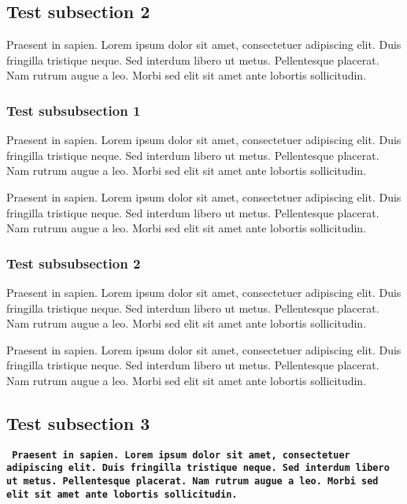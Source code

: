 \subsection*{Test subsection 2}
Praesent in sapien. Lorem ipsum dolor sit amet, consectetuer adipiscing elit.
Duis fringilla tristique neque. Sed interdum libero ut metus. Pellentesque placerat.
Nam rutrum augue a leo. Morbi sed elit sit amet ante lobortis sollicitudin.

\subsubsection*{Test subsubsection 1}
Praesent in sapien. Lorem ipsum dolor sit amet, consectetuer adipiscing elit.
Duis fringilla tristique neque. Sed interdum libero ut metus. Pellentesque placerat.
Nam rutrum augue a leo. Morbi sed elit sit amet ante lobortis sollicitudin.

Praesent in sapien. Lorem ipsum dolor sit amet, consectetuer adipiscing elit.
Duis fringilla tristique neque. Sed interdum libero ut metus. Pellentesque placerat.
Nam rutrum augue a leo. Morbi sed elit sit amet ante lobortis sollicitudin.

\subsubsection*{Test subsubsection 2}
Praesent in sapien. Lorem ipsum dolor sit amet, consectetuer adipiscing elit.
Duis fringilla tristique neque. Sed interdum libero ut metus. Pellentesque placerat.
Nam rutrum augue a leo. Morbi sed elit sit amet ante lobortis sollicitudin.

Praesent in sapien. Lorem ipsum dolor sit amet, consectetuer adipiscing elit.
Duis fringilla tristique neque. Sed interdum libero ut metus. Pellentesque placerat.
Nam rutrum augue a leo. Morbi sed elit sit amet ante lobortis sollicitudin.

\subsection*{Test subsection 3}
\texttt{
\textbf{
Praesent in sapien. Lorem ipsum dolor sit amet, consectetuer adipiscing elit.
Duis fringilla tristique neque. Sed interdum libero ut metus. Pellentesque placerat.
Nam rutrum augue a leo. Morbi sed elit sit amet ante lobortis sollicitudin.
}
}

